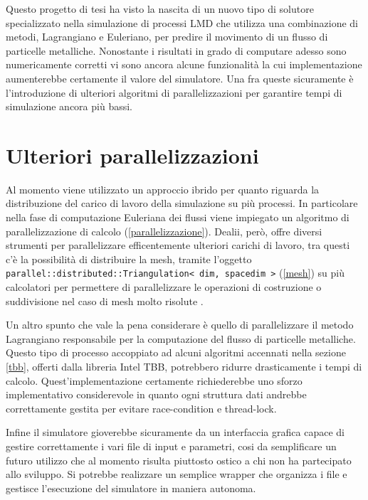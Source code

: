 Questo progetto di tesi ha visto la nascita di un nuovo tipo di solutore specializzato nella simulazione di processi LMD che utilizza una combinazione
di metodi, Lagrangiano e Euleriano, per predire il movimento di un flusso di particelle metalliche. Nonostante i risultati in grado di computare adesso
sono numericamente corretti vi sono ancora alcune funzionalità la cui implementazione aumenterebbe certamente il valore del simulatore.
Una fra queste sicuramente è l'introduzione di ulteriori algoritmi di parallelizzazioni per garantire tempi di simulazione ancora più bassi. 
\section{Ulteriori parallelizzazioni}\label{DistribuzioneTriangulation}
Al momento viene utilizzato un approccio ibrido per quanto riguarda la distribuzione del carico di lavoro della simulazione su più processi.
In particolare nella fase di computazione Euleriana dei flussi viene impiegato un algoritmo di parallelizzazione di calcolo (\ref*{parallelizzazione}).
Dealii, però, offre diversi strumenti per parallelizzare efficentemente ulteriori carichi di lavoro, tra questi c'è la possibilità di distribuire la 
mesh, tramite l'oggetto \texttt{parallel::distributed::Triangulation< dim, spacedim >} (\ref*{mesh}) su più calcolatori per permettere di parallelizzare 
le operazioni di costruzione o suddivisione nel caso di mesh molto risolute \cite{BBHK11}.

Un altro spunto che vale la pena considerare è quello di parallelizzare il metodo Lagrangiano responsabile per la computazione del flusso di particelle metalliche.
Questo tipo di processo accoppiato ad alcuni algoritmi accennati nella sezione \ref*{tbb}, offerti dalla libreria Intel TBB, potrebbero ridurre drasticamente i tempi di calcolo.
Quest'implementazione certamente richiederebbe uno sforzo implementativo considerevole in quanto ogni struttura dati andrebbe correttamente gestita per evitare race-condition e thread-lock.

Infine il simulatore gioverebbe sicuramente da un interfaccia grafica capace di gestire correttamente i vari file di input e parametri, cosi da semplificare un futuro utilizzo
che al momento risulta piuttosto ostico a chi non ha partecipato allo sviluppo. Si potrebbe realizzare un semplice wrapper che organizza i file e gestisce l'esecuzione del simulatore
in maniera autonoma.